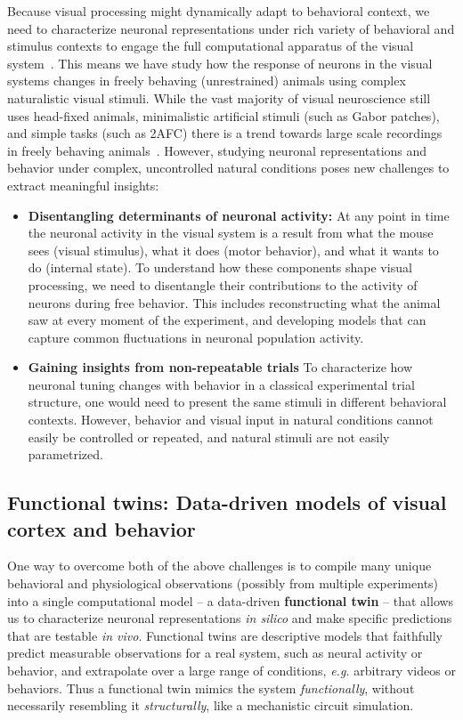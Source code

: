 \documentclass[B2,COG]{ercgrant}
\begin{document}
Because visual processing might dynamically adapt to behavioral context, we need to characterize neuronal representations under rich variety of behavioral and stimulus contexts to engage the full computational apparatus of the visual system~\parencite{Huk2018-ez, Datta2019-qj}. 
This means we have study how the response of neurons in the visual systems changes in freely behaving (unrestrained) animals using complex naturalistic visual stimuli.
While the vast majority of visual neuroscience still uses head-fixed animals, minimalistic artificial stimuli (such as Gabor patches), and simple tasks (such as 2AFC) there is a trend towards large scale recordings in freely behaving 
 animals~\parencite{Parker2022-ac}.
However, studying neuronal representations and behavior under complex, uncontrolled natural conditions poses new challenges to extract meaningful insights:
\begin{itemize}
    \item \textbf{Disentangling determinants of neuronal activity:} At any point in time the neuronal activity in the visual system is a result from what the mouse sees (visual stimulus), what it does (motor behavior), and what it wants to do (internal state). 
    To understand how these components shape visual processing, we need to disentangle their contributions to the activity of neurons during free behavior. 
    This includes reconstructing what the animal saw at every moment of the experiment, and developing models that can capture common fluctuations in neuronal population activity.
    \item \textbf{Gaining insights from non-repeatable trials} 
    To characterize how neuronal tuning changes with behavior in a classical experimental trial structure, one would need to present the same stimuli in different behavioral contexts. 
    However, behavior and visual input in natural conditions cannot easily be controlled or repeated, and natural stimuli are not easily parametrized.
\end{itemize}



\subsection{Functional twins: Data-driven models of visual cortex and behavior}
One way to overcome both of the above challenges is to compile many unique behavioral and physiological observations (possibly from multiple experiments) into a single computational model -- a data-driven \textbf{functional twin} -- that allows us to characterize neuronal representations \textit{in silico} and make specific predictions that are testable \textit{in vivo}. 
Functional twins are descriptive models that faithfully predict measurable observations for a real system, such as neural activity or behavior, and extrapolate over a large range of conditions, \textit{e.g.} arbitrary videos or behaviors. 
Thus a functional twin mimics the system \textit{functionally}, without necessarily resembling it \textit{structurally}, like a mechanistic circuit simulation.  
\end{document}
